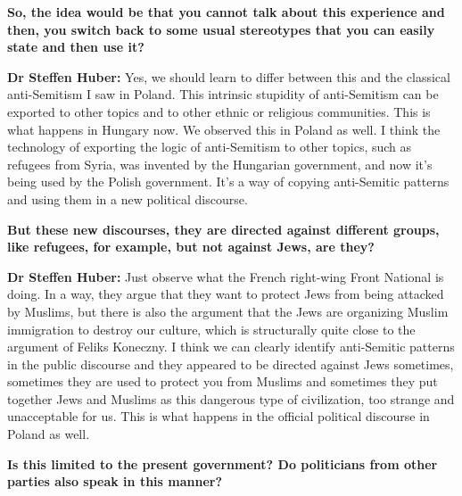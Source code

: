 \textbf{So, the idea would be that you cannot talk about this experience and then, you switch back to some usual stereotypes that you can easily state and then use it?} 

\textbf{Dr Steffen Huber:} Yes, we should learn to differ between this and the classical anti-Semitism I saw in Poland. This intrinsic stupidity of anti-Semitism can be exported to other topics and to other ethnic or religious communities. This is what happens in Hungary now. We observed this in Poland as well. I think the technology of exporting the logic of anti-Semitism to other topics, such as refugees from Syria, was invented by the Hungarian government, and now it's being used by the Polish government. It’s a way of copying anti-Semitic patterns and using them in a new political discourse. 

\textbf{But these new discourses, they are directed against different groups, like refugees, for example, but not against Jews, are they?}  

\textbf{Dr Steffen Huber:} Just observe what the French right-wing Front National is doing. In a way, they argue that they want to protect Jews from being attacked by Muslims, but there is also the argument that the Jews are organizing Muslim immigration to destroy our culture, which is structurally quite close to the argument of Feliks Koneczny. I think we can clearly identify anti-Semitic patterns in the public discourse and they appeared to be directed against Jews sometimes, sometimes they are used to protect you from Muslims and sometimes they put together Jews and Muslims as this dangerous type of civilization, too strange and unacceptable for us. This is what happens in the official political discourse in Poland as well. 

\textbf{Is this limited to the present government? Do politicians from other parties also speak in this manner?} 

